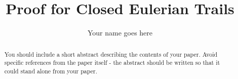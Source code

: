 \documentclass[10pt]{amsart}
\begin{document}
\parskip10pt
\parindent12pt
\baselineskip16pt






\def\G{\widetilde{G}}
\def\B{\widetilde{B}}
\def\T{\widetilde{T}}
\def\C{\mathbb{C}}
\def\A{\mathbb{A}}
\def\Z{\mathbb{Z}}
\def\R{\mathbb{R}}
\def\Q{\mathbb{Q}}
\def\N{\mathbb{N}}
\def\C{\mathbb{C}}
\def\F{\mathbb{F}}
\def\I{\mathbb{I}}
\def\H{\mathcal{H}}
\def\e{\varepsilon}
\def\s{\underline s}
\def\z{\zeta }
\def\vp{\varpi }
\def\O{\mathcal O}
\def\v{\upsilon }
\def\U{\Upsilon }
\def\p{\wp }
\def\p{\mathfrak{p}}
\def\B{\mathfrak{B}}

\newtheorem{theorem}{Theorem}%
\newtheorem{lemma}[theorem]{Lemma}













\title{Proof for Closed Eulerian Trails}

\author{Your name goes here}




\begin{abstract}
You should include a short abstract describing the contents of your paper.  Avoid specific references from the paper itself - the abstract should be written so that it could stand alone from your paper.\end{abstract}
\end{document}
